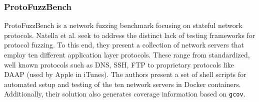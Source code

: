 \subsubsection{ProtoFuzzBench}
\label{extend:netfuzz:benchmarks:protofuzzbench}

ProtoFuzzBench \cite{natella2021profuzzbench} is a network fuzzing benchmark focusing on stateful network protocols. Natella et al. seek to address the distinct lack of testing frameworks for protocol fuzzing. To this end, they present a collection of network servers that employ ten different application layer protocols. These range from standardized, well known protocols such as DNS, SSH, FTP to proprietary protocols like DAAP (used by Apple in iTunes). The authors present a set of shell scripts for automated setup and testing of the ten network servers in Docker containers. Additionally, their solution also generates coverage information based on \texttt{gcov}.
